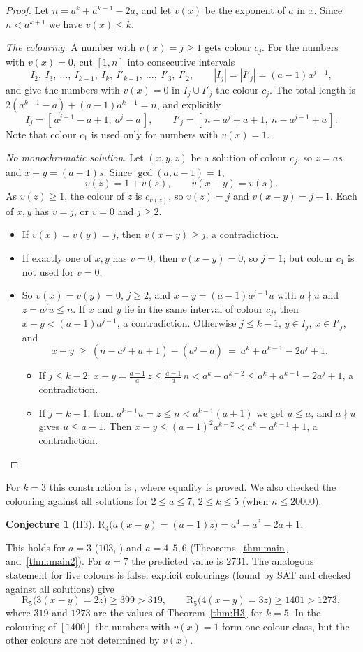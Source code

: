 \documentclass[11pt,a4paper]{article}
\newtheorem{conjecture}[theorem]{Conjecture}
\theoremstyle{definition}
\theoremstyle{remark}
\newcommand{\R}{\mathrm{R}}
\begin{document}
\begin{proof}
Let $n=a^k+a^{k-1}-2a$, and let $v(x)$ be the exponent of $a$ in $x$. Since $n<a^{k+1}$ we have $v(x)\le k$.

\emph{The colouring.} A number with $v(x)=j\ge1$ gets colour $c_j$. For the numbers with $v(x)=0$, cut $[1,n]$ into consecutive intervals
\[
  I_2,\ I_3,\ \dots,\ I_{k-1},\ I_k,\ I'_{k-1},\ \dots,\ I'_3,\ I'_2,\qquad |I_j|=|I'_j|=(a-1)a^{j-1},
\]
and give the numbers with $v(x)=0$ in $I_j\cup I'_j$ the colour $c_j$. The total length is $2(a^{k-1}-a)+(a-1)a^{k-1}=n$, and explicitly
\[
  I_j=[\,a^{j-1}-a+1,\ a^j-a\,],\qquad I'_j=[\,n-a^j+a+1,\ n-a^{j-1}+a\,].
\]
Note that colour $c_1$ is used only for numbers with $v(x)=1$.

\emph{No monochromatic solution.} Let $(x,y,z)$ be a solution of colour $c_j$, so $z=as$ and $x-y=(a-1)s$. Since $\gcd(a,a-1)=1$,
\[
  v(z)=1+v(s),\qquad v(x-y)=v(s).
\]
As $v(z)\ge1$, the colour of $z$ is $c_{v(z)}$, so $v(z)=j$ and $v(x-y)=j-1$. Each of $x,y$ has $v=j$, or $v=0$ and $j\ge2$.
\begin{itemize}
\item If $v(x)=v(y)=j$, then $v(x-y)\ge j$, a contradiction.
\item If exactly one of $x,y$ has $v=0$, then $v(x-y)=0$, so $j=1$; but colour $c_1$ is not used for $v=0$.
\item So $v(x)=v(y)=0$, $j\ge2$, and $x-y=(a-1)a^{j-1}u$ with $a\nmid u$ and $z=a^ju\le n$.
  If $x$ and $y$ lie in the same interval of colour $c_j$, then $x-y<(a-1)a^{j-1}$, a contradiction.
  Otherwise $j\le k-1$, $y\in I_j$, $x\in I'_j$, and
  \[
    x-y\ \ge\ (n-a^j+a+1)-(a^j-a)\ =\ a^k+a^{k-1}-2a^j+1 .
  \]
  \begin{itemize}
  \item If $j\le k-2$: $x-y=\frac{a-1}{a}\,z\le\frac{a-1}{a}\,n<a^k-a^{k-2}\le a^k+a^{k-1}-2a^j+1$, a contradiction.
  \item If $j=k-1$: from $a^{k-1}u=z\le n<a^{k-1}(a+1)$ we get $u\le a$, and $a\nmid u$ gives $u\le a-1$. Then $x-y\le(a-1)^2a^{k-2}<a^k-a^{k-1}+1$, a contradiction. \qedhere
  \end{itemize}
\end{itemize}
\end{proof}
For $k=3$ this construction is \cite[Lemma~4.2]{CDW22}, where equality is proved. We also checked the colouring against all solutions for $2\le a\le7$, $2\le k\le5$ (when $n\le20000$).

\begin{conjecture}[H3]
$\R_4\bigl(a(x-y)=(a-1)z\bigr)=a^4+a^3-2a+1$.
\end{conjecture}
This holds for $a=3$ ($103$, \cite{CDW22}) and $a=4,5,6$ (Theorems~\ref{thm:main} and~\ref{thm:main2}). For $a=7$ the predicted value is $2731$. The analogous statement for five colours is false: explicit colourings (found by SAT and checked against all solutions) give
\[
  \R_5\bigl(3(x-y)=2z\bigr)\ge399>319,\qquad \R_5\bigl(4(x-y)=3z\bigr)\ge1401>1273,
\]
where $319$ and $1273$ are the values of Theorem~\ref{thm:H3} for $k=5$. In the colouring of $[1400]$ the numbers with $v(x)=1$ form one colour class, but the other colours are not determined by $v(x)$.
\end{document}
